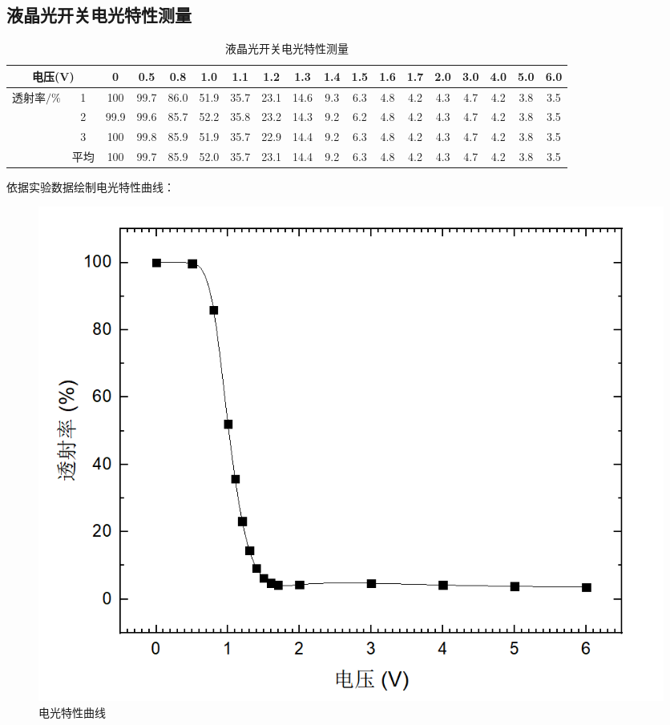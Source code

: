 \documentclass{report}
\begin{document}
	\subsection{液晶光开关电光特性测量}
	\begin{table}[!h]
		\centering
		\caption{\heiti{}液晶光开关电光特性测量}
		\begin{tabular}{|c|c|c|c|c|c|c|c|c|c|c|c|c|c|c|c|c|c|}
			
			\hline
			\multicolumn{2}{|c|}{电压(V)}&0&0.5&0.8&1.0&1.1&1.2&1.3&1.4&1.5&1.6&1.7&2.0&3.0&4.0&5.0&6.0\\
			\hline
			\multirow{4}{*}{透射率$ /\% $}&1&100&99.7&86.0&51.9&35.7&23.1&14.6&9.3&6.3&4.8&4.2&4.3&4.7&4.2&3.8&3.5\\
			\cline{2-18}
			\multirow{4}{*}{}&2&99.9&99.6&85.7&52.2&35.8&23.2&14.3&9.2&6.2&4.8&4.2&4.3&4.7&4.2&3.8&3.5\\
			\cline{2-18}
			\multirow{4}{*}{}&3&100&99.8&85.9&51.9&35.7&22.9&14.4&9.2&6.3&4.8&4.2&4.3&4.7&4.2&3.8&3.5\\
			\cline{2-18}
			\multirow{4}{*}{}&平均&100&99.7&85.9&52.0&35.7&23.1&14.4&9.2&6.3&4.8&4.2&4.3&4.7&4.2&3.8&3.5\\
			\hline
			
			
			
			
			
			
		\end{tabular}
	\end{table}
	依据实验数据绘制电光特性曲线：
	\begin{figure}
		\centering
		\includegraphics[scale=0.5]{电压}
		\caption{\heiti{}电光特性曲线}
		
	\end{figure}
	
\end{document}

